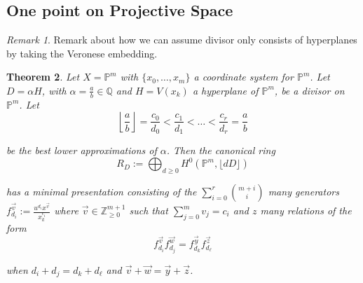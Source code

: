 \documentclass{amsart}
\theoremstyle{plain}
\newtheorem{thm}{Theorem}[section]
\theoremstyle{definition}
\theoremstyle{remark}
\newtheorem{rem}[thm]{Remark}
\numberwithin{equation}{section}
\newcommand\ssec{\subsection}
\newcommand\bq{{\mathbb Q}}
\newcommand\bp{{\mathbb P}}
\newcommand\bz{{\mathbb Z}}
\begin{document}
\ssec{One point on Projective Space}
\label{ssec:proj-one-point}

\begin{rem}
Remark about how we can assume divisor only consists of hyperplanes
by taking the Veronese embedding.
\end{rem}


\begin{thm}
\label{thm:proj-one-point}
Let $X = \bp^m$ with $\{x_0, \ldots, x_m\}$ a coordinate system for
$\bp^m$. Let $D = \alpha H$, with $\alpha = \frac{a}{b} \in \bq$
and $H = V(x_k)$ a hyperplane of $\bp^m$, be a divisor on $\bp^m$.
Let
\[
	\left\lfloor \frac{a}{b} \right\rfloor = \frac{c_0}{d_0} <
	\frac{c_1}{d_1} < \ldots < \frac{c_r}{d_r} = \frac{a}{b}
\]

\noindent
be the best lower approximations of $\alpha$. Then the
canonical ring
\[
	R_D := \bigoplus_{d \geq 0} H^0(\bp^m, \lfloor dD \rfloor)
\]

\noindent
has a minimal presentation consisting of the $\sum_{i = 0}^{r}
{{m + i} \choose {i}}$ many generators $f_{d_i}^{\vec{v}} :=
\frac{u^{d_i} x^{\vec{v}}} {x_k^{c_i}}$ where $\vec{v} \in
\bz_{\geq 0}^{m + 1}$ such that $\sum_{j = 0}^{m} v_j = c_i$ and $z$ 
many relations of the form
\[
	f_{d_i}^{\vec{v}} f_{d_j}^{\vec{w}} = f_{d_k}^{\vec{y}} f_{d_\ell}^{\vec{z}}
\]

\noindent
when $d_i + d_j = d_k + d_\ell$ and $\vec{v} + \vec{w} = \vec{y} +
\vec{z}$.
\end{thm}
\end{document}
